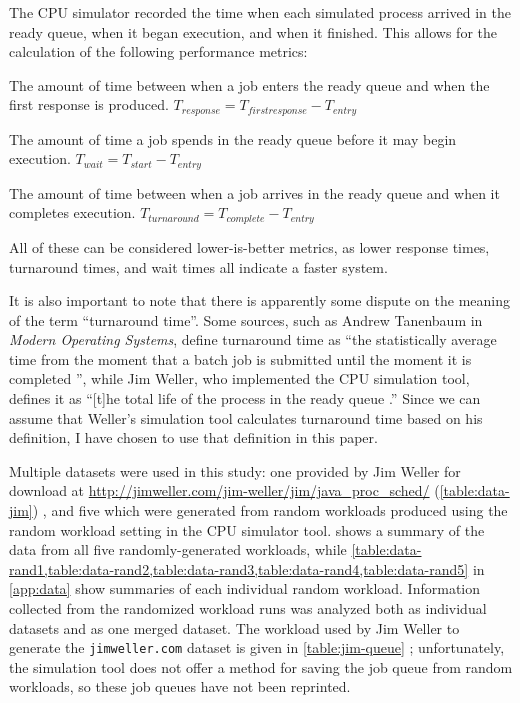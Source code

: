 \documentclass[12pt,letterpaper]{article}
\begin{document}
			The CPU simulator recorded the time when each simulated process arrived in the ready queue, when it began execution, and when it finished. This allows for the calculation of the following performance metrics:

				\begin{description}[leftmargin=4.5cm, style=sameline]
					\item[Response Time]{The amount of time between when a job enters the ready queue and when the first response is produced. $T_{response} = T_{first response} - T_{entry}$}
					\item[Wait Time]{The amount of time a job spends in the ready queue before it may begin execution. $T_{wait} = T_{start} - T_{entry}$}
					\item[Turnaround Time]{The amount of time between when a job arrives in the ready queue and when it completes execution. $T_{turnaround} = T_{complete} - T_{entry}$}
				\end{description}

			All of these can be considered lower-is-better metrics, as lower response times, turnaround times, and wait times all indicate a faster system.

			It is also important to note that there is apparently some dispute on the meaning of the term ``turnaround time''. Some sources, such as Andrew Tanenbaum in \textit{Modern Operating Systems}, define turnaround time as ``the statistically average time from the moment that a batch job is submitted until the moment it is completed \cite{tanenbaum2007modern}'', while Jim Weller, who implemented the CPU simulation tool, defines it as ``[t]he total life of the process in the ready queue \cite{jimweller}.'' Since we can assume that Weller's simulation tool calculates turnaround time based on his definition, I have chosen to use that definition in this paper.

			Multiple datasets were used in this study: one provided by Jim Weller for download at \url{http://jimweller.com/jim-weller/jim/java_proc_sched/} (\cref{table:data-jim}) \cite{jimweller}, and five which were generated from random workloads produced using the random workload setting in the CPU simulator tool.  shows a summary of the data from all five randomly-generated workloads, while \cref{table:data-rand1,table:data-rand2,table:data-rand3,table:data-rand4,table:data-rand5} in \cref{app:data} show summaries of each individual random workload. Information collected from the randomized workload runs was analyzed both as individual datasets and as one merged dataset. The workload used by Jim Weller to generate the \texttt{jimweller.com} dataset is given in \cref{table:jim-queue} \cite{jimweller}; unfortunately, the simulation tool does not offer a method for saving the job queue from random workloads, so these job queues have not been reprinted.
\end{document}
